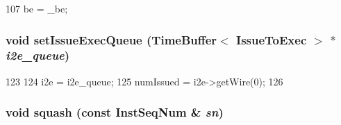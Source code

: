 \begin{DoxyCode}
107 { be = _be; }
\end{DoxyCode}
\hypertarget{classBackEnd_1_1InstQueue_adff8385686f237650837ba2fbf13e5da}{
\subsubsection[{setIssueExecQueue}]{\setlength{\rightskip}{0pt plus 5cm}void setIssueExecQueue ({\bf TimeBuffer}$<$ {\bf IssueToExec} $>$ $\ast$ {\em i2e\_\-queue})}}
\label{classBackEnd_1_1InstQueue_adff8385686f237650837ba2fbf13e5da}



\begin{DoxyCode}
123 {
124     i2e = i2e_queue;
125     numIssued = i2e->getWire(0);
126 }
\end{DoxyCode}
\hypertarget{classBackEnd_1_1InstQueue_adc9b67ce59b0b2e930cfaf6361ce42c5}{
\subsubsection[{squash}]{\setlength{\rightskip}{0pt plus 5cm}void squash (const {\bf InstSeqNum} \& {\em sn})}}
\label{classBackEnd_1_1InstQueue_adc9b67ce59b0b2e930cfaf6361ce42c5}



